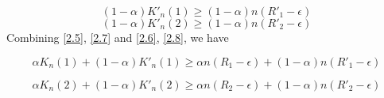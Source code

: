 \documentclass{article}
\begin{document}
  \begin{equation}
	\left(1 - \alpha  \right)  K'_{n}(1) \geq \left(1 - \alpha  \right) n\left( R'_1 - \epsilon \right) \label{2.7}
\end{equation}
\begin{equation}
	\left(1 - \alpha  \right) K'_{n}(2) \geq   \left(1 - \alpha  \right)n\left( R'_2 - \epsilon \right) \label{2.8}
\end{equation}
   Combining \eqref{2.5}, \eqref{2.7} and \eqref{2.6}, \eqref{2.8}, we have 
 
\begin{equation}
	\alpha K_{n}(1)	+ \left(1 - \alpha  \right) K'_{n}(1) \geq   \alpha n\left( R_1 - \epsilon \right) +  \left(1 - \alpha  \right)n\left( R'_1 - \epsilon \right) \label{2.9
	}
\end{equation}   
  
\begin{equation}
 \alpha K_{n}(2)	+ \left(1 - \alpha  \right) K'_{n}(2) \geq   \alpha n\left( R_2 - \epsilon \right) +  \left(1 - \alpha  \right)n\left( R'_2 - \epsilon \right) \label{2.10}
\end{equation}  
  
\end{document}
